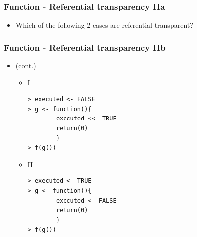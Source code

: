 \documentclass[bigger]{beamer}
\begin{document}
\begin{frame}
\frametitle{Function - Referential transparency IIa}
\label{sec-3-8}
\begin{itemize}

\item Which of the following 2 cases are referential transparent?
\label{sec-3-8-1}%
\end{itemize} %
\end{frame}
\begin{frame}[fragile]
\frametitle{Function - Referential transparency IIb}
\label{sec-3-9}
\begin{itemize}

\item (cont.)
\label{sec-3-9-1}%
\begin{itemize}

\item I\\
\label{sec-3-9-1-1}%
\begin{verbatim}
> executed <- FALSE
> g <- function(){
        executed <<- TRUE
        return(0)
        }
> f(g())
\end{verbatim}



\item II\\
\label{sec-3-9-1-2}%
\begin{verbatim}
> executed <- TRUE
> g <- function(){
        executed <- FALSE
        return(0)
        }
> f(g())
\end{verbatim}


\end{itemize} %
\end{itemize} %
\end{frame}
\end{document}
